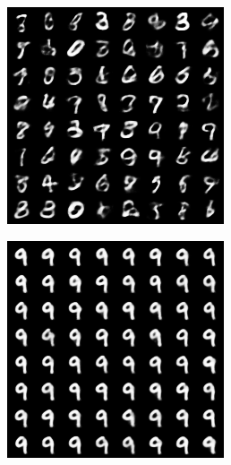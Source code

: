 \documentclass{article}
\begin{document}
\begin{figure}[!h]
\centering
    \begin{subfigure}[b]{.24\linewidth}
        \centering
        \includegraphics[width=\linewidth]{mnist_mmvae_image_sample.png}
        \caption{}
    \end{subfigure}
    \begin{subfigure}[b]{.24\linewidth}
        \centering
        \includegraphics[width=\linewidth]{mnist_mmvae_condition_on_image_text_9_image_sample.png}

\end{subfigure}
\end{figure}
\end{document}
